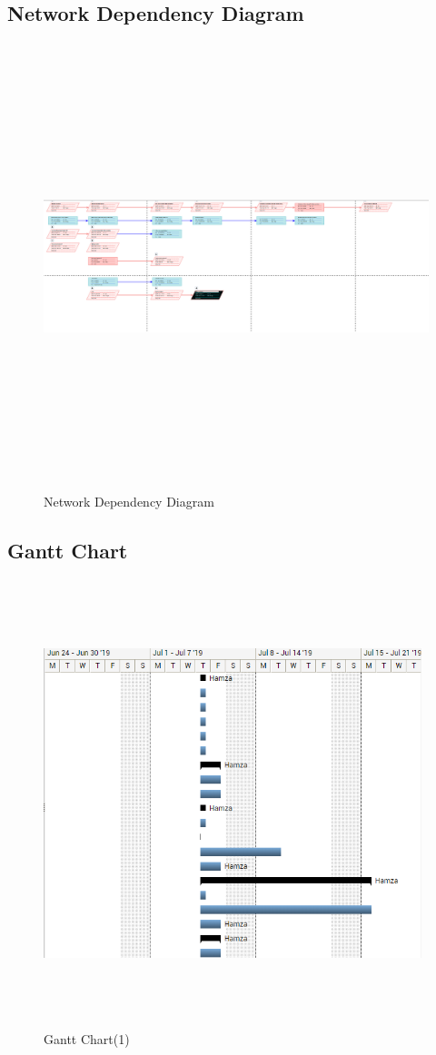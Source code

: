 \documentclass[12pt]{article}
\begin{document}
\subsection{Network Dependency Diagram}

\begin{figure}[h]
  \centering
  \includegraphics[width=13cm, height=13cm]{NetworkDependencyDiagram}
  \caption{Network Dependency Diagram}
\end{figure}

\newpage
\subsection{Gantt Chart}
\begin{figure}[h]
  \centering
  \includegraphics[width=11cm, height=13cm]{GanttChart1}
  \caption{Gantt Chart(1)}
\end{figure}
\end{document}
